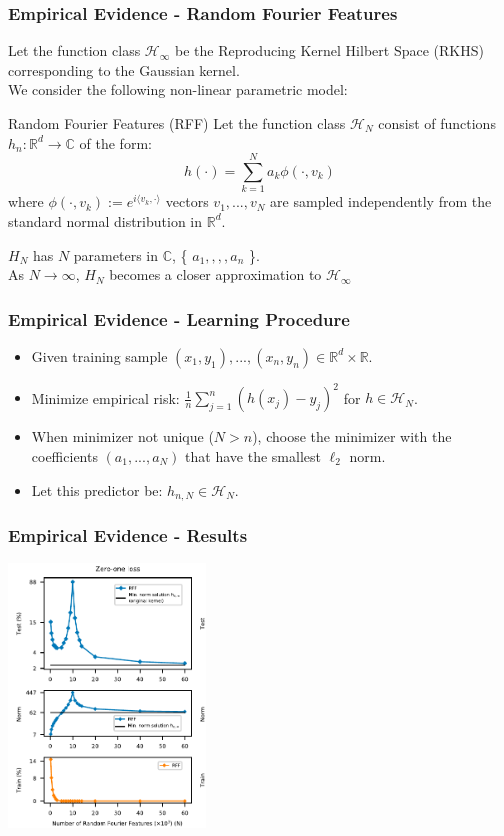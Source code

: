 \documentclass{beamer}
\begin{document}
\begin{frame}
\frametitle{Empirical Evidence - Random Fourier Features}
Let the function class  $\mathcal{H}_\infty$ be the Reproducing Kernel Hilbert Space (RKHS) corresponding to the Gaussian kernel.\\
We consider the following non-linear parametric model:
\begin{block}{Random Fourier Features (RFF)}
	Let the function class  $\mathcal{H}_N $ consist of functions $h_n : \mathbb{R}^d \to \mathbb{C}$ of the form:
	\[ h(\cdot) = \sum_{k=1}^{N} a_k\phi(\cdot, v_k) \] 
	where $\phi(\cdot , v_k) := e^{i
	\langle v_k , \cdot \rangle }$
	vectors $v_1, ... , v_N$ are sampled independently from the standard normal distribution in $\mathbb{R}^d$.
\end{block}
$H_N$ has $N$ parameters in $\mathbb{C}$, \{ $a_1, ,,, a_n$ \}.\\
As $N \to \infty$, $H_N$ becomes a closer approximation to $\mathcal{H}_\infty$
\end{frame}

\begin{frame}
\frametitle{Empirical Evidence - Learning Procedure}
\begin{itemize}[itemsep = 12pt]
	\item Given training sample $(x_1, y_1), ..., (x_n, y_n) \in \mathbb{R}^d \times \mathbb{R}$.
	\item Minimize empirical risk: $\frac{1}{n}\sum_{j=1}^{n}(h(x_j)-y_j)^2$ for $h \in \mathcal{H}_N$.
	\item When minimizer not unique ($N > n$), choose the minimizer with the coefficients $(a_1, ..., a_N)$ that have the smallest $\ell_2$ norm.
	\item Let this predictor be: $h_{n,N} \in \mathcal{H}_N$.
\end{itemize}
\end{frame}

\begin{frame}
\frametitle{Empirical Evidence - Results}
\centering
\includegraphics[height=7cm]{RFF-results.png}
\end{frame}
\end{document}
